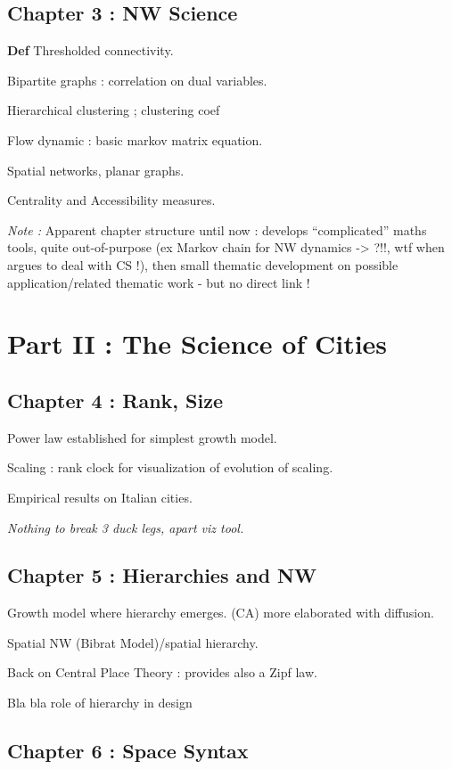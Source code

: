 \subsection{Chapter 3 : NW Science}

\textbf{Def} Thresholded connectivity.

Bipartite graphs : correlation on dual variables.

Hierarchical clustering ; clustering coef

Flow dynamic : basic markov matrix equation.

Spatial networks, planar graphs.

Centrality and Accessibility measures.

\textit{Note : } Apparent chapter structure until now : develops ``complicated'' maths tools, quite out-of-purpose (ex Markov chain for NW dynamics -> ?!!, wtf when argues to deal with CS !), then small thematic development on possible application/related thematic work - but no direct link !


\section*{Part II : The Science of Cities}

\subsection{Chapter 4 : Rank, Size}

Power law established for simplest growth model.

Scaling : rank clock for visualization of evolution of scaling.

Empirical results on Italian cities.

\textit{Nothing to break 3 duck legs, apart viz tool.}


\subsection{Chapter 5 : Hierarchies and NW}

Growth model where hierarchy emerges. (CA) more elaborated with diffusion.

Spatial NW (Bibrat Model)/spatial hierarchy.

Back on Central Place Theory : provides also a Zipf law.

Bla bla role of hierarchy in design


\subsection{Chapter 6 : Space Syntax}

